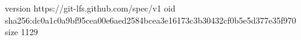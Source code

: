 version https://git-lfs.github.com/spec/v1
oid sha256:dc0a1c0a9bf95cea00e6aed2584bcea3e16173c3b30432cf0b5e5d377e35f970
size 1129

